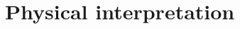 \documentclass[output=paper]{langsci/langscibook}
\begin{document}
\section{Physical interpretation} 
\label{sectPI}




\end{document}
